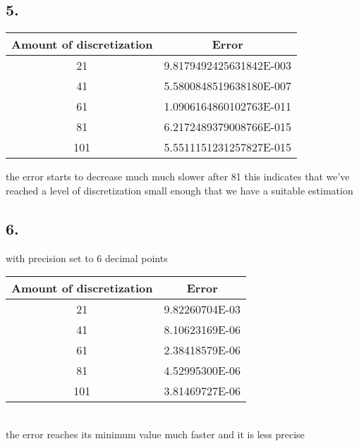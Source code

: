 \documentclass{article}
\begin{document}
        \subsection*{5.}
            \begin{table}[ht]
                \centering
                \begin{tabular}{|c|c|}
                    \hline
                    \textbf{Amount of discretization} & \textbf{Error}\\
                    \hline
                    21 & \num{9.8179492425631842E-003} \\
                    41 & \num{5.5800848519638180E-007} \\
                    61 & \num{1.0906164860102763E-011} \\
                    81 & \num{6.2172489379008766E-015} \\
                    101 & \num{5.5511151231257827E-015} \\
                    \hline
                \end{tabular}
            \end{table}
            the error starts to decrease much much slower after 81 this indicates that we've reached a level of discretization small enough
            that we have a suitable estimation
        \subsection*{6.}
            with precision set to 6 decimal points \\
            \begin{table}[ht]
                \centering
                \begin{tabular}{|c|c|}
                    \hline
                    \textbf{Amount of discretization} & \textbf{Error}\\
                    \hline
                    21 & \num{9.82260704E-03} \\
                    41 & \num{8.10623169E-06} \\
                    61 & \num{2.38418579E-06} \\
                    81 & \num{4.52995300E-06} \\
                    101 & \num{3.81469727E-06} \\
                    \hline
                \end{tabular}
            \end{table}
            \\
            the error reaches its minimum value much faster and it is less precise
\end{document}
